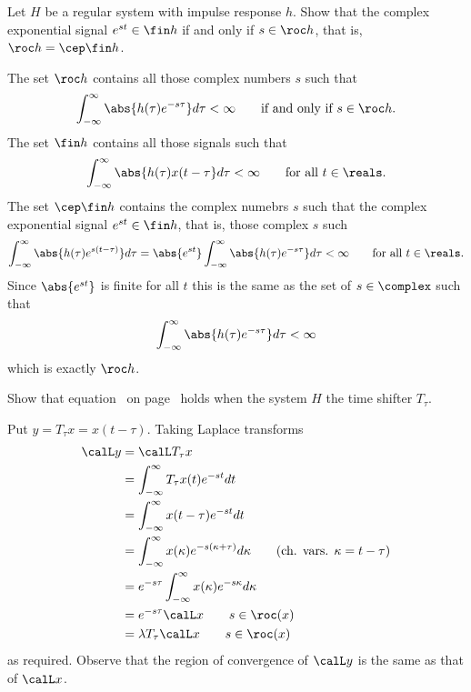 \begin{excersizelist}
\item \label{exer:finhandroch} Let $H$ be a regular system with impulse response $h$.  Show that the complex exponential signal $e^{st} \in \fin h$ if and only if $s \in \roc h$, that is, $\roc h = \cep \fin h$.
\begin{solution}
The set $\roc h$ contains all those complex numbers $s$ such that
\[
\int_{-\infty}^{\infty} \abs{h(\tau) e^{-s \tau}} d\tau < \infty  \qquad \text{if and only if $s \in \roc h$}.
\]
The set $\fin h$ contains all those signals such that
\[
\int_{-\infty}^{\infty} \abs{h(\tau) x(t - \tau} d\tau < \infty  \qquad \text{for all $t \in \reals$}.
\]
The set $\cep \fin h$ contains the complex numebrs $s$ such that the complex exponential signal $e^{st} \in \fin h$, that is, those complex $s$ such
\[
\int_{-\infty}^{\infty} \abs{h(\tau) e^{s(t - \tau)}} d\tau = \abs{e^{st}} \int_{-\infty}^{\infty} \abs{h(\tau) e^{-s \tau}} d\tau < \infty  \qquad \text{for all $t \in \reals$}.
\]
Since $\abs{e^{st}}$ is finite for all $t$ this is the same as the set of $s \in \complex$ such that
\[
\int_{-\infty}^{\infty} \abs{h(\tau) e^{-s \tau}} d\tau < \infty
\] 
which is exactly $\roc h$.
\end{solution}

\item \label{exer:laplacetranstimeshift} Show that equation~ on page~ holds when the system $H$ the time shifter $T_\tau$. 
\begin{solution}
Put $y = T_\tau x = x(t- \tau)$.  Taking Laplace transforms
\begin{align*}
\calL y &= \calL T_\tau x \\
&= \int_{-\infty}^{\infty} T_\tau x(t) e^{-st} dt \\
&= \int_{-\infty}^{\infty} x(t - \tau) e^{-st} dt \\
&= \int_{-\infty}^{\infty} x(\kappa) e^{-s(\kappa + \tau)} d\kappa \qquad \text{(ch. vars. $\kappa = t - \tau$)} \\
&= e^{-s\tau}\int_{-\infty}^{\infty} x(\kappa) e^{-s\kappa} d\kappa \\
&= e^{-s\tau} \calL x \qquad s \in \roc(x) \\
&= \lambda T_\tau  \calL x \qquad s \in \roc(x)
\end{align*}
as required.  Observe that the region of convergence of $\calL y$ is the same as that of $\calL x$.
\end{solution}


\end{excersizelist}
